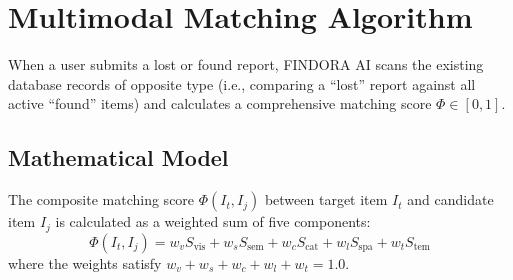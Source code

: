 \documentclass[conference]{IEEEtran}
\begin{document}
\section{Multimodal Matching Algorithm}
When a user submits a lost or found report, FINDORA AI scans the existing database records of opposite type (i.e., comparing a ``lost'' report against all active ``found'' items) and calculates a comprehensive matching score $\Phi \in [0, 1]$.

\subsection{Mathematical Model}
The composite matching score $\Phi(I_t, I_j)$ between target item $I_t$ and candidate item $I_j$ is calculated as a weighted sum of five components:
\begin{equation}
    \Phi(I_t, I_j) = w_v S_{\text{vis}} + w_s S_{\text{sem}} + w_c S_{\text{cat}} + w_l S_{\text{spa}} + w_t S_{\text{tem}}
\end{equation}
where the weights satisfy $w_v + w_s + w_c + w_l + w_t = 1.0$.
\end{document}
